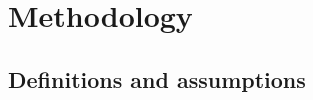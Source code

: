 
\chapter{Methodology}

\ifpdf
    \graphicspath{{Chapter5/Figs/Raster/}{Chapter5/Figs/PDF/}{Chapter5/Figs/}}
\else
    \graphicspath{{Chapter5/Figs/Vector/}{Chapter5/Figs/}}
\fi

\section{Definitions and assumptions}

